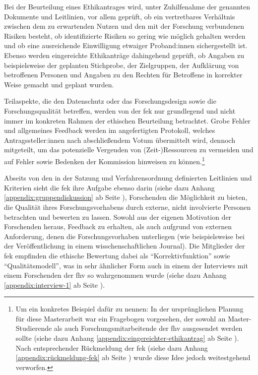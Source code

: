 \documentclass[a4paper,12pt,twoside]{scrreprt}
\begin{document}
Bei der Beurteilung eines Ethikantrages wird, unter Zuhilfenahme der genannten Dokumente und Leitlinien, vor allem geprüft, ob ein vertretbares Verhältnis zwischen dem zu erwartenden Nutzen und den mit der Forschung verbundenen Risiken besteht, ob identifizierte Risiken so gering wie möglich gehalten werden und ob eine ausreichende Einwilligung etwaiger Proband:innen sichergestellt ist. Ebenso werden eingereichte Ethikanträge dahingehend geprüft, ob Angaben zu beispielsweise der geplanten Stichprobe, der Zielgruppen, der Aufklärung von betroffenen Personen und Angaben zu den Rechten für Betroffene in korrekter Weise gemacht und geplant wurden. \cite[1\psq]{forschungsethik-kommission_der_fachhochschule_vorarlberg_verfahrensordnung_2020}

Teilaspekte, die den Datenschutz oder das Forschungsdesign sowie die Forschungsqualität betreffen, werden von der \ac{fek} nur grundlegend und nicht immer im konkreten Rahmen der ethischen Beurteilung betrachtet. Grobe Fehler und allgemeines Feedback werden im angefertigten Protokoll, welches Antragssteller:innen nach abschließendem Votum übermittelt wird, dennoch mitgeteilt, um das potenzielle Vergeuden von (Zeit-)Ressourcen zu vermeiden und auf Fehler sowie Bedenken der Kommission hinweisen zu können.\footnote{Um ein konkretes Beispiel dafür zu nennen: In der ursprünglichen Planung für diese Masterarbeit war ein Fragebogen vorgesehen, der sowohl an Master-Studierende als auch Forschungsmitarbeitende der \ac{fhv} ausgesendet werden sollte (siehe dazu Anhang \ref{appendix:eingereichter-ethikantrag} ab Seite \pageref{appendix:eingereichter-ethikantrag}). Nach entsprechender Rückmeldung der \ac{fek} (siehe dazu Anhang \ref{appendix:rückmeldung-fek} ab Seite \pageref{appendix:rückmeldung-fek}) wurde diese Idee jedoch weitestgehend verworfen.\label{footnote:ursprüngliche-planung-leitfaden}} \cite[1\psq]{forschungsethik-kommission_der_fachhochschule_vorarlberg_verfahrensordnung_2020}

\medskip

Abseits von den in der Satzung und Verfahrensordnung definierten Leitlinien und Kriterien sieht die \ac{fek} ihre Aufgabe ebenso darin (siehe dazu Anhang \ref{appendix:gruppendiskussion} ab Seite \pageref{appendix:gruppendiskussion}), Forschenden die Möglichkeit zu bieten, die Qualität ihres Forschungsvorhabens durch externe, nicht involvierte Personen betrachten und bewerten zu lassen. Sowohl aus der eigenen Motivation der Forschenden heraus, Feedback zu erhalten, als auch aufgrund von externen Anforderung, denen die Forschungsvorhaben unterliegen (wie beispielsweise bei der Veröffentlichung in einem wisschenschaftlichen Journal). Die Mitglieder der \ac{fek} empfinden die ethische Bewertung dabei als \enquote{Korrektivfunktion} sowie \enquote{Qualitätsmodell}, was in sehr ähnlicher Form auch in einem der Interviews mit einem Forschenden der \ac{fhv} so wahrgenommen wurde (siehe dazu Anhang \ref{appendix:interview-1} ab Seite \pageref{appendix:interview-1}).
\end{document}
